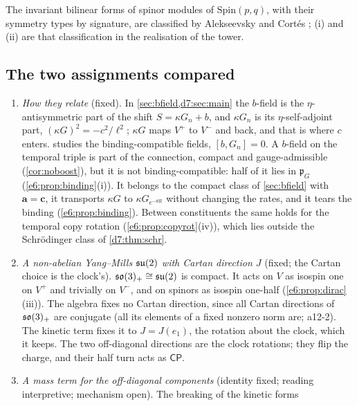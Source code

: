 The invariant bilinear forms of spinor modules of $\mathrm{Spin}(p,q)$, with their symmetry types by signature, are classified by Alekseevsky and
Cort\'es \cite{AlekseevskyCortes97}; (i) and (ii) are that classification in the realisation of the tower.

\subsection{The two assignments compared}
\label{e6:sec:compare}

\begin{remark}
\label{e6:rem:compare}
\begin{enumerate}[label=(\alph*),leftmargin=2.2em]
\item \emph{How they relate} (fixed). In \cref{sec:bfield,d7:sec:main} the $b$-field is the $\eta$-antisymmetric part of the shift $S=\kappa G_n+b$, and
$\kappa G_n$ is its $\eta$-self-adjoint part, $(\kappa G)^2=-c^2/\ell^2$; $\kappa G$ maps $V^+$ to $V^-$ and back, and that is where $c$ enters.  studies the binding-compatible fields, $[b,G_n]=0$. A $b$-field on the temporal triple is part of the connection, compact and
gauge-admissible (\cref{cor:noboost}), but it is not binding-compatible: half of it lies in $\mathfrak p_G$
(\cref{e6:prop:binding}(i)). It belongs to the compact class of \cref{sec:bfield} with $\mathbf a=\mathbf c$, it transports $\kappa G$ to
$\kappa G_{e^{-\theta R}}$ without changing the rates, and it tears the binding (\cref{e6:prop:binding}). Between constituents the same holds for the
temporal copy rotation (\cref{e6:prop:copyrot}(iv)), which lies outside the Schr\"odinger class of \cref{d7:thm:schr}.
\item \emph{A non-abelian Yang--Mills $\mathfrak{su}(2)$ with Cartan direction $J$} (fixed; the Cartan choice is the clock's). $\mathfrak{so}(3)_+\cong\mathfrak{su}(2)$ is compact. It acts on
$V$ as isospin one on $V^+$ and trivially on $V^-$, and on spinors as isospin one-half (\cref{e6:prop:dirac}(iii)). The algebra fixes no Cartan direction,
since all Cartan directions of $\mathfrak{so}(3)_+$ are conjugate (all its elements of a fixed nonzero norm are; a12-2). The kinetic term fixes it to $J=J(e_1)$, the rotation about the clock, which it keeps. The two
off-diagonal directions are the clock rotations; they flip the charge, and their half turn acts as $\mathsf{CP}$.
\item \emph{A mass term for the off-diagonal components} (identity fixed; reading interpretive; mechanism open). The breaking of the kinetic forms

\end{enumerate}
\end{remark}
